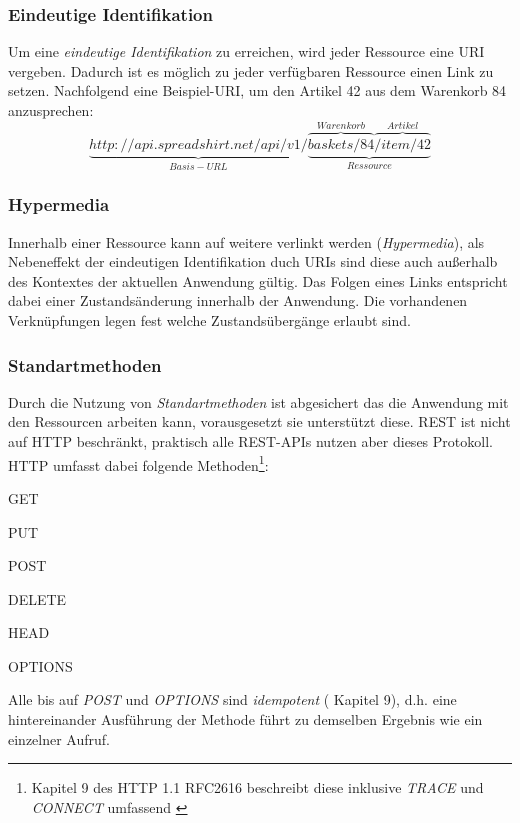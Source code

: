 \subsubsection{Eindeutige Identifikation}
\label{sec:unambigiousidentification}

Um eine \emph{eindeutige Identifikation} zu erreichen, wird jeder Ressource eine \gls{URI} vergeben. Dadurch ist es möglich zu jeder verfügbaren Ressource einen Link zu setzen. 
Nachfolgend eine Beispiel-\gls{URI}, um den Artikel 42 aus dem Warenkorb 84 anzusprechen:
\[
    \underbrace{http://api.spreadshirt.net/api/v1/}_{Basis-URL}\underbrace{\overbrace{baskets/84}^{Warenkorb}\overbrace{/item/42}^{Artikel}}_{Ressource}
    \label{RESTexampleURL}
\]

\subsubsection{Hypermedia}

Innerhalb einer Ressource kann auf weitere verlinkt werden (\emph{Hypermedia}), als Nebeneffekt der eindeutigen Identifikation duch \glspl{URI} sind diese auch außerhalb des Kontextes der aktuellen Anwendung gültig. Das Folgen eines Links entspricht dabei einer Zustandsänderung innerhalb der Anwendung.
Die vorhandenen Verknüpfungen legen fest welche Zustandsübergänge  erlaubt sind.

\subsubsection{Standartmethoden}

Durch die Nutzung von \emph{Standartmethoden} ist abgesichert das die Anwendung mit den Ressourcen arbeiten kann, vorausgesetzt sie unterstützt diese. \gls{REST} ist nicht auf HTTP beschränkt, praktisch alle REST-APIs nutzen aber dieses Protokoll. HTTP umfasst dabei folgende Methoden\footnote{Kapitel 9 des HTTP 1.1 RFC2616 beschreibt diese inklusive \emph{TRACE} und \emph{CONNECT} umfassend \cite{HTTP11RFC}}:
\begin{compactitem}
    \item GET
    \item PUT
    \item POST
    \item DELETE
    \item HEAD
    \item OPTIONS
\end{compactitem}

Alle bis auf \emph{POST} und \emph{OPTIONS} sind \emph{idempotent} (\cite{HTTP11RFC} Kapitel 9), d.h. eine hintereinander Ausführung der Methode führt zu demselben Ergebnis wie ein einzelner Aufruf.

